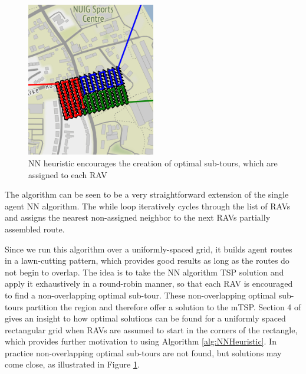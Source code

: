\begin{figure}[h]
\centering
\includegraphics[width=0.5\textwidth]{Chapters/MultiAgentCoverage/Figs/RAVRoutingNUIGCropped.png}
\caption{NN heuristic encourages the creation of optimal sub-tours, which are assigned to each RAV}
\label{fig:NNPartitioning}
\end{figure}

The algorithm can be seen to be a very straightforward extension of the single agent NN algorithm. The while loop iteratively cycles through the list of RAVs and assigns the nearest non-assigned neighbor to the next RAVs partially assembled route.

Since we run this algorithm over a uniformly-spaced grid, it builds agent routes in a lawn-cutting pattern, which provides good results as long as the routes do not begin to overlap. The idea is to take the NN algorithm TSP solution and apply it exhaustively in a round-robin manner, so that each RAV is encouraged to find a non-overlapping optimal sub-tour. These non-overlapping optimal sub-tours partition the region and therefore offer a solution to the mTSP. Section 4 of \cite{Hungerlander2018TheGrids} gives an insight to how optimal solutions can be found for a uniformly spaced rectangular grid when RAVs are assumed to start in the corners of the rectangle, which provides further motivation to using Algorithm \ref{alg:NNHeuristic}. In practice non-overlapping optimal sub-tours are not found, but solutions may come close, as illustrated in Figure \ref{fig:NNPartitioning}.


